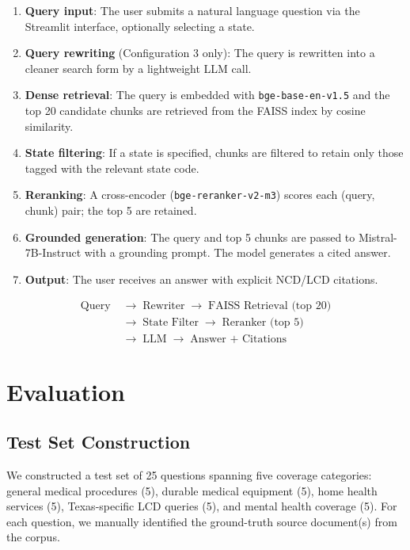 \documentclass[12pt, letterpaper]{article}
\begin{document}
\begin{enumerate}[noitemsep, topsep=4pt]
    \item \textbf{Query input}: The user submits a natural language question via the
          Streamlit interface, optionally selecting a state.
    \item \textbf{Query rewriting} (Configuration 3 only): The query is rewritten
          into a cleaner search form by a lightweight LLM call.
    \item \textbf{Dense retrieval}: The query is embedded with \texttt{bge-base-en-v1.5}
          and the top 20 candidate chunks are retrieved from the FAISS index by cosine
          similarity.
    \item \textbf{State filtering}: If a state is specified, chunks are filtered to
          retain only those tagged with the relevant state code.
    \item \textbf{Reranking}: A cross-encoder (\texttt{bge-reranker-v2-m3}) scores
          each (query, chunk) pair; the top 5 are retained.
    \item \textbf{Grounded generation}: The query and top 5 chunks are passed to
          Mistral-7B-Instruct with a grounding prompt. The model generates a cited answer.
    \item \textbf{Output}: The user receives an answer with explicit NCD/LCD citations.
\end{enumerate}
\[
\begin{aligned}
\text{Query} &\;\rightarrow\; \text{Rewriter}
\;\rightarrow\; \text{FAISS Retrieval (top 20)} \\
&\;\rightarrow\; \text{State Filter}
\;\rightarrow\; \text{Reranker (top 5)} \\
&\;\rightarrow\; \text{LLM}
\;\rightarrow\; \text{Answer + Citations}
\end{aligned}
\]
\section{Evaluation}

\subsection{Test Set Construction}

We constructed a test set of 25 questions spanning five coverage categories:
general medical procedures (5), durable medical equipment (5), home health services (5),
Texas-specific LCD queries (5), and mental health coverage (5). For each question, we
manually identified the ground-truth source document(s) from the corpus.
\end{document}
